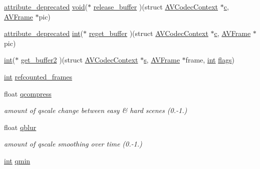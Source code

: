 \begin{DoxyCompactItemize}
\item 
\hyperlink{attributes_8h_aa6d076561d3a9eea4729ee632652de02}{attribute\+\_\+deprecated} \hyperlink{sound_8c_ae35f5844602719cf66324f4de2a658b3}{void}($\ast$ \hyperlink{struct_a_v_codec_context_ac934a388c7779e800c13914ff00b6916}{release\+\_\+buffer} )(struct \hyperlink{struct_a_v_codec_context}{A\+V\+Codec\+Context} $\ast$\hyperlink{rfft2d_test_m_l_8m_ae0323a9039add2978bf5b49550572c7c}{c}, \hyperlink{struct_a_v_frame}{A\+V\+Frame} $\ast$pic)
\item 
\hyperlink{attributes_8h_aa6d076561d3a9eea4729ee632652de02}{attribute\+\_\+deprecated} \hyperlink{xmltok_8h_a5a0d4a5641ce434f1d23533f2b2e6653}{int}($\ast$ \hyperlink{struct_a_v_codec_context_ac568dd88fe0dab777fe35641d955f44d}{reget\+\_\+buffer} )(struct \hyperlink{struct_a_v_codec_context}{A\+V\+Codec\+Context} $\ast$\hyperlink{rfft2d_test_m_l_8m_ae0323a9039add2978bf5b49550572c7c}{c}, \hyperlink{struct_a_v_frame}{A\+V\+Frame} $\ast$pic)
\item 
\hyperlink{xmltok_8h_a5a0d4a5641ce434f1d23533f2b2e6653}{int}($\ast$ \hyperlink{struct_a_v_codec_context_aef79333a4c6abf1628c55d75ec82bede}{get\+\_\+buffer2} )(struct \hyperlink{struct_a_v_codec_context}{A\+V\+Codec\+Context} $\ast$\hyperlink{lib_2expat_8h_a755339d27872b13735c2cab829e47157}{s}, \hyperlink{struct_a_v_frame}{A\+V\+Frame} $\ast$frame, \hyperlink{xmltok_8h_a5a0d4a5641ce434f1d23533f2b2e6653}{int} \hyperlink{struct_a_v_codec_context_abb01e291550fa3fb96188af4d494587e}{flags})
\item 
\hyperlink{xmltok_8h_a5a0d4a5641ce434f1d23533f2b2e6653}{int} \hyperlink{struct_a_v_codec_context_ab16d1e0c729a7b63d918d5ec027ba064}{refcounted\+\_\+frames}
\item 
float \hyperlink{struct_a_v_codec_context_acf47505d34bd4b5a9292268f9aed1faa}{qcompress}
\begin{DoxyCompactList}\small\item\em amount of qscale change between easy \& hard scenes (0.-\/1.) \end{DoxyCompactList}\item 
float \hyperlink{struct_a_v_codec_context_acf7ff44bfb16c8f4da1e7c1567964074}{qblur}
\begin{DoxyCompactList}\small\item\em amount of qscale smoothing over time (0.-\/1.) \end{DoxyCompactList}\item 
\hyperlink{xmltok_8h_a5a0d4a5641ce434f1d23533f2b2e6653}{int} \hyperlink{struct_a_v_codec_context_a3f63bc9141e25bf7f1cda0cef7cd4a60}{qmin}

\end{DoxyCompactItemize}

